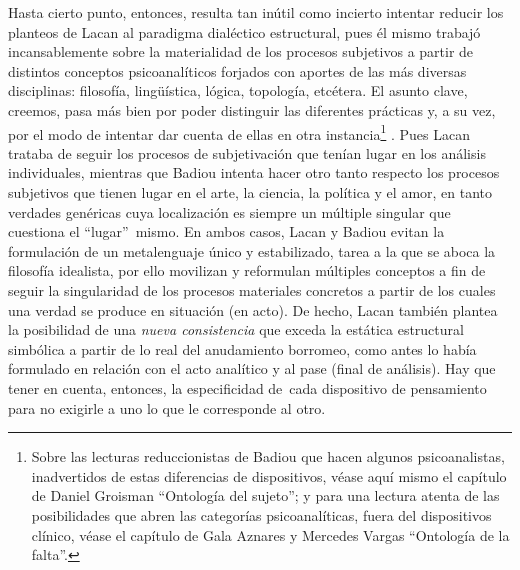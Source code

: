 Hasta cierto punto, entonces, resulta tan inútil como incierto intentar reducir los planteos de Lacan al paradigma dialéctico estructural, pues él mismo trabajó incansablemente sobre la materialidad de los procesos subjetivos a partir de distintos conceptos psicoanalíticos forjados con aportes de las más diversas disciplinas: filosofía, lingüística, lógica, topología, etcétera. El asunto clave, creemos, pasa más bien por poder distinguir las diferentes prácticas y, a su vez, por el modo de intentar dar cuenta de ellas en otra instancia\footnote{Sobre las lecturas reduccionistas de Badiou que hacen algunos psicoanalistas, inadvertidos de estas diferencias de dispositivos, véase aquí mismo el capítulo de Daniel Groisman \enquote{Ontología del sujeto}; y para una lectura atenta de las posibilidades que abren las categorías psicoanalíticas, fuera del dispositivos clínico, véase el capítulo de Gala Aznares y Mercedes Vargas \enquote{Ontología de la falta}.} . Pues Lacan trataba de seguir los procesos de subjetivación que tenían lugar en los análisis individuales, mientras que Badiou intenta hacer otro tanto respecto los procesos subjetivos que tienen lugar en el arte, la ciencia, la política y el amor, en tanto verdades genéricas cuya localización es siempre un múltiple singular que cuestiona el \enquote{lugar}~mismo. En ambos casos, Lacan y Badiou evitan la formulación de un metalenguaje único y estabilizado, tarea a la que se aboca la filosofía idealista, por ello movilizan y reformulan múltiples conceptos a fin de seguir la singularidad de los procesos materiales concretos a partir de los cuales una verdad se produce en situación (en acto). De hecho, Lacan también plantea la posibilidad de una \emph{nueva consistencia} que exceda la estática estructural simbólica a partir de lo real del anudamiento borromeo, como antes lo había formulado en relación con el acto analítico y al pase (final de análisis). Hay que tener en cuenta, entonces, la especificidad de~cada dispositivo de pensamiento para no exigirle a uno lo que le corresponde al otro.

